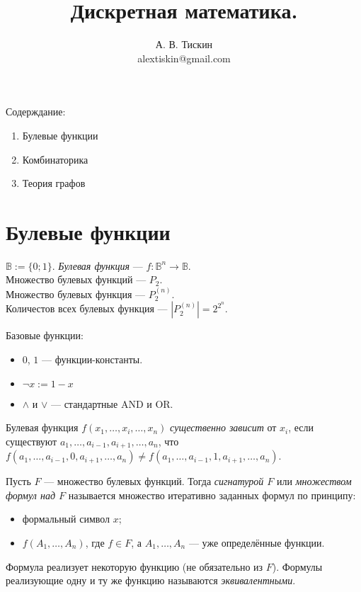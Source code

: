 \documentclass[12pt,a4paper]{article}
\title{Дискретная математика.}
\author{А. В. Тискин\\alextiskin@gmail.com}
\date{}
\newcommand{\BB}[1][]{\ensuremath{\mathbb{B}#1}\xspace}
\begin{document}
    \maketitle

    Содерждание:
    \begin{enumerate}
        \item Булевые функции
        \item Комбинаторика
        \item Теория графов
    \end{enumerate}

    \section{Булевые функции}

    \begin{definition}
        $\BB := \{0; 1\}$. \emph{Булевая функция} --- $f: \BB^n \to \BB$.\\
        Множество булевых функций --- $P_2$.\\
        Множество булевых функция --- $P^{(n)}_2$.\\
        Количестов всех булевых функция --- $\left|P^{(n)}_2\right|=2^{2^n}$.
    \end{definition}

    \begin{definition}
        Базовые функции:
        \begin{itemize}
            \item $0$, $1$ --- функции-константы.
            \item $\neg x := 1-x$
            \item $\wedge$ и $\vee$ --- стандартные AND и OR. 
        \end{itemize}
    \end{definition}

    \begin{definition}
        Булевая функция $f(x_1, \dots, x_i, \dots, x_n)$ \emph{существенно зависит} от $x_i$, если существуют $a_1, \dots, a_{i-1}, a_{i+1}, \dots, a_n$, что $f(a_1, \dots, a_{i-1}, 0, a_{i+1}, \dots, a_n) \neq f(a_1, \dots, a_{i-1}, 1, a_{i+1}, \dots, a_n)$.
    \end{definition}

    \begin{definition}
        Пусть $F$ --- множество булевых функций. Тогда \emph{сигнатурой $F$} или \emph{множеством формул над $F$} называется множество итеративно заданных формул по принципу:
        \begin{itemize}
            \item формальный символ $x$;
            \item $f(A_1, \dots, A_n)$, где $f\in F$, а $A_1, \dots, A_n$ --- уже определённые функции.
        \end{itemize}

        Формула реализует некоторую функцию (не обязательно из $F$). Формулы реализующие одну и ту же функцию называются \emph{эквивалентными}.
    \end{definition}
\end{document}
